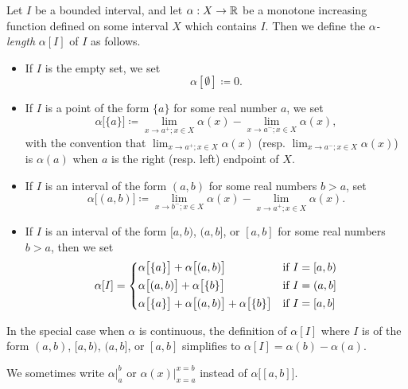 \begin{defn}\label{11.8.1}
  Let \(I\) be a bounded interval, and let \(\alpha : X \to \mathbb{R}\) be a monotone increasing function defined on some interval \(X\) which contains \(I\).
  Then we define the \emph{\(\alpha\)-length} \(\alpha[I]\) of \(I\) as follows.
  \begin{itemize}
    \item If \(I\) is the empty set, we set
          \[
            \alpha[\emptyset] \coloneqq 0.
          \]
    \item If \(I\) is a point of the form \(\{a\}\) for some real number \(a\), we set
          \[
            \alpha\big[\{a\}\big] \coloneqq \lim_{x \to a^+ ; x \in X} \alpha(x) - \lim_{x \to a^- ; x \in X} \alpha(x),
          \]
          with the convention that \(\lim_{x \to a^+ ; x \in X} \alpha(x)\) (resp. \(\lim_{x \to a^- ; x \in X} \alpha(x)\)) is \(\alpha(a)\) when \(a\) is the right (resp. left) endpoint of \(X\).
    \item If \(I\) is an interval of the form \((a, b)\) for some real numbers \(b > a\), set
          \[
            \alpha\big[(a, b)\big] \coloneqq \lim_{x \to b^- ; x \in X} \alpha(x) - \lim_{x \to a^+ ; x \in X} \alpha(x).
          \]
    \item If \(I\) is an interval of the form \([a, b)\), \((a, b]\), or \([a, b]\) for some real numbers \(b > a\), then we set
          \[
            \alpha[I] = \begin{dcases}
              \alpha\big[\{a\}\big] + \alpha\big[(a, b)\big]                         & \text{if } I = [a, b) \\
              \alpha\big[(a, b)\big] + \alpha\big[\{b\}\big]                         & \text{if } I = (a, b] \\
              \alpha\big[\{a\}\big] + \alpha\big[(a, b)\big] + \alpha\big[\{b\}\big] & \text{if } I = [a, b]
            \end{dcases}
          \]
  \end{itemize}
\end{defn}

\begin{note}
  In the special case when \(\alpha\) is continuous, the definition of \(\alpha[I]\) where \(I\) is of the form \((a, b)\), \([a, b)\), \((a, b]\), or \([a, b]\) simplifies to \(\alpha[I] = \alpha(b) - \alpha(a)\).
\end{note}

\begin{note}
  We sometimes write \(\alpha\big|_a^b\) or \(\alpha(x)\big|_{x = a}^{x = b}\) instead of \(\alpha\big[[a, b]\big]\).
\end{note}

